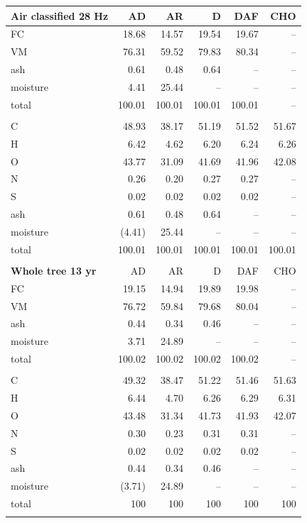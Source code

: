 \begin{center}
\begin{longtable}{lrrrrr}
    \textbf{Air classified 28 Hz} & AD & AR & D & DAF & CHO \\
    \midrule
    FC       & 18.68  & 14.57  & 19.54  & 19.67  & -- \\
    VM       & 76.31  & 59.52  & 79.83  & 80.34  & -- \\
    ash      & 0.61   & 0.48   & 0.64   & --     & -- \\
    moisture & 4.41   & 25.44  & --     & --     & -- \\
    total    & 100.01 & 100.01 & 100.01 & 100.01 & -- \\
    \\
    C        & 48.93  & 38.17  & 51.19  & 51.52  & 51.67 \\
    H        & 6.42   & 4.62   & 6.20   & 6.24   & 6.26 \\
    O        & 43.77  & 31.09  & 41.69  & 41.96  & 42.08 \\
    N        & 0.26   & 0.20   & 0.27   & 0.27   & -- \\
    S        & 0.02   & 0.02   & 0.02   & 0.02   & -- \\
    ash      & 0.61   & 0.48   & 0.64   & --     & -- \\
    moisture & (4.41) & 25.44  & --     & --     & -- \\
    total    & 100.01 & 100.01 & 100.01 & 100.01 & 100.01 \\
    \\

    \textbf{Whole tree 13 yr} & AD & AR & D & DAF & CHO \\
    \midrule
    FC       & 19.15  & 14.94  & 19.89  & 19.98  & -- \\
    VM       & 76.72  & 59.84  & 79.68  & 80.04  & -- \\
    ash      & 0.44   & 0.34   & 0.46   & --     & -- \\
    moisture & 3.71   & 24.89  & --     & --     & -- \\
    total    & 100.02 & 100.02 & 100.02 & 100.02 & -- \\
    \\
    C        & 49.32  & 38.47  & 51.22  & 51.46  & 51.63 \\
    H        & 6.44   & 4.70   & 6.26   & 6.29   & 6.31 \\
    O        & 43.48  & 31.34  & 41.73  & 41.93  & 42.07 \\
    N        & 0.30   & 0.23   & 0.31   & 0.31   & -- \\
    S        & 0.02   & 0.02   & 0.02   & 0.02   & -- \\
    ash      & 0.44   & 0.34   & 0.46   & --     & -- \\
    moisture & (3.71) & 24.89  & --     & --     & -- \\
    total    & 100    & 100    & 100    & 100    & 100 \\
    \\


\end{longtable}
\end{center}
